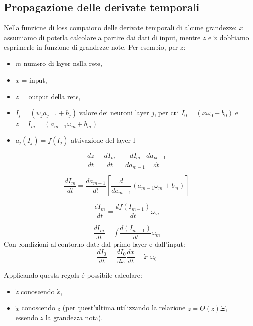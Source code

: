 \documentclass[11pt]{article}
\begin{document}
\subsection{Propagazione delle derivate temporali }
Nella funzione di loss compaiono delle derivate temporali di alcune grandezze: $\dot{x}$ assumiamo di poterla calcolare a partire dai dati di input, mentre $\dot{z}$ e $\dot{\tilde{x}}$ dobbiamo  esprimerle in funzione di grandezze note.
Per esempio, per $\dot{z}$:
\begin{itemize}
\item $m$  numero di layer nella rete,
\item $x$ =   input,
\item $z$ =   output della rete,
\item $I_j = (w_ja_{j-1} + b_j)$ valore dei neuroni layer $j$, per cui $\boxed{I_0 = (x\omega_0 + b_0)}$ e  $\boxed{z = I_m = (a_{m-1}\omega_m + b_m)}$
\item $a_{j}(I_j) = f(I_j)$ attivazione del layer l,
\end{itemize}
\begin{equation}
\frac{dz}{dt} = \frac{dI_m}{dt} = 
\frac{dI_m}{da_{m-1}}\frac{da_{m-1}}{dt}
\end{equation}

\begin{equation}
\frac{dI_m}{dt} = 
\frac{da_{m-1}}{dt} \left[\frac{d}{da_{m-1}} (a_{m-1}\omega_m + b_m)\right]
\end{equation}

\begin{equation}
\frac{dI_m}{dt} = \frac{df(I_{m-1})}{dt}  \omega_m
\end{equation}

\begin{equation}
\boxed{
\frac{dI_m}{dt} = f^\prime \frac{d(I_{m-1})}{dt}  \omega_m
}
\end{equation}%
Con condizioni al contorno date dal primo layer e dall'input:
\begin{equation}
\boxed{
\frac{dI_0}{dt} = \frac{dI_0}{dx}\frac{dx}{dt} = \dot{x} \; \omega_0
}
\end{equation}

Applicando questa regola é possibile calcolare:
\begin{itemize}
\item $\dot{z}$ conoscendo $\dot{x}$,
\item $\dot{\tilde{x}}$ conoscendo $\dot{z}$ (per quest'ultima utilizzando la relazione $\dot{z} = \Theta(z) \Xi$, essendo $z$ la grandezza nota).
\end{itemize}
\end{document}
